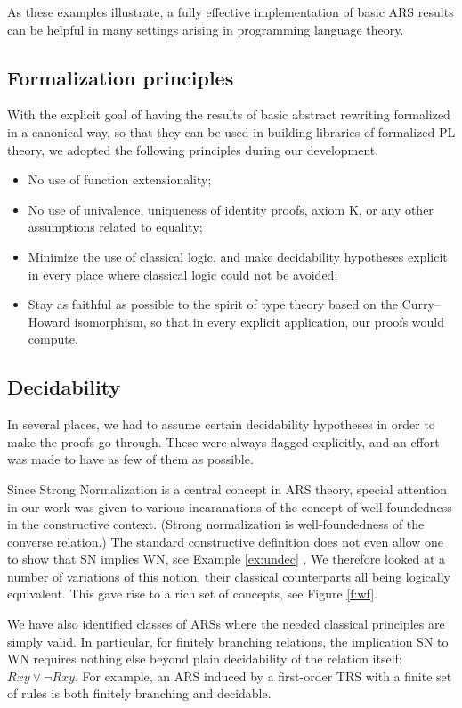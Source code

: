 As these examples illustrate, a fully effective implementation of basic ARS results
can be helpful in many settings arising in programming language theory.

\subsection{Formalization principles}
With the explicit goal of having the results of basic abstract rewriting
formalized in a canonical way, so that they can be used in building
libraries of formalized PL theory, we adopted the following
principles during our development.

\begin{itemize}
  \item No use of function extensionality;
  \item No use of univalence, uniqueness of identity proofs, axiom K, or any other
  assumptions related to equality;
  \item Minimize the use of classical logic, and make decidability hypotheses explicit in every place where classical logic could not be avoided;
  \item Stay as faithful as possible to the spirit of type theory based on the Curry--Howard isomorphism, so that in every explicit application, our proofs would compute.
\end{itemize}

\subsection{Decidability}
In several places, we had to assume certain decidability hypotheses in order to make
the proofs go through.  These were always flagged explicitly, and an effort was made to
have as few of them as possible.

Since Strong Normalization is a central concept in ARS theory,
special attention in our work was given to various incaranations of the concept of well-foundedness in the constructive context.
(Strong normalization is well-foundedness of the converse relation.)
The standard constructive definition does not even allow one to show that SN implies WN, see Example \ref{ex:undec} .
  We therefore looked at a number of variations of this notion, their classical counterparts all being logically equivalent.  This gave rise to a rich set of concepts, see Figure \ref{f:wf}.

We have also identified classes of ARSs where the needed classical principles are simply valid.  In particular, for finitely branching relations, the implication SN to WN requires nothing else beyond plain decidability of the relation itself: $Rxy \lor \lnot Rxy$.  For example, an ARS induced by a first-order TRS with a finite set of rules is both finitely branching and decidable.


